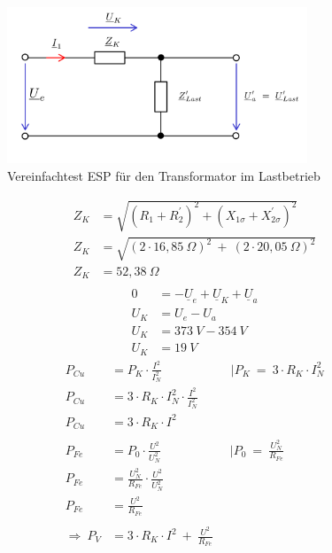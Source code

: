 \begin{enumerate}[label=\alph*)]
	      \begin{figure}[h!]
		      \begin{center}
			      \includegraphics[width=0.8\textwidth]{img/4.2.2.2}
		      \end{center}
		      \caption{Vereinfachtest ESP für den Transformator im Lastbetrieb}\label{img:4.2.2.2}
	      \end{figure}
	      \begin{align*}
		      Z_{K} & = \sqrt{(R_{1}+R^{'}_{2})^2+(X_{1\sigma}+X^{'}_{2\sigma})^2}   \\
		      Z_{K} & = \sqrt{(2\cdot 16,85\ \Omega)^2\ +\ (2\cdot 20,05\ \Omega)^2} \\
		      Z_{K} & =52,38\ \Omega                                                 \\
	      \end{align*}
	      \begin{align*}
		      0     & = -\underline{U}_{e}+\underline{U}_{K}+\underline{U}_{a} \\
		      U_{K} & = U_{e}-U_{a}                                            \\
		      U_{K} & = 373\ V - 354\ V                                        \\
		      U_{K} & = 19\ V
	      \end{align*}
	      \begin{align*}
		      P_{Cu}               & = P_K\cdot \frac{I^2}{I^2_N}\mspace{100mu} |P_K\ =\ 3\cdot R_K\cdot I^2_N \\
		      P_{Cu}               & = 3\cdot R_K\cdot I^2_N\cdot \frac{I^2}{I^2_N}                            \\
		      P_{Cu}               & = 3\cdot R_K\cdot I^2                                                     \\
		      \\
		      P_{Fe}               & = P_0\cdot \frac{U^2}{U^2_N}\mspace{100mu} |P_0\ =\ \frac{U^2_N}{R_{Fe}}  \\
		      P_{Fe}               & = \frac{U^2_N}{R_{Fe}}\cdot \frac{U^2}{U^2_N}                             \\
		      P_{Fe}               & = \frac{U^2}{R_{Fe}}                                                      \\
		      \\
		      \Longrightarrow\ P_V & = 3\cdot R_K\cdot I^2\ +\ \frac{U^2}{R_{Fe}}
	      \end{align*}


\end{enumerate}
